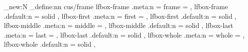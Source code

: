 
\dim_new:N \@tempdimd
\keys_define:nn { cus/frame }
  {
    lfbox-frame  .meta:n = { frame  = { \lfbox [{#1}] } } ,
    lfbox-frame .default:n = solid ,
    lfbox-first  .meta:n = { first  = { \lfbox [{#1}] } } ,
    lfbox-first .default:n = solid ,
    lfbox-middle .meta:n = { middle = { \lfbox [{#1}] } } ,
    lfbox-middle .default:n = solid ,
    lfbox-last   .meta:n = { last   = { \lfbox [{#1}] } } ,
    lfbox-last .default:n = solid ,
    lfbox-whole  .meta:n = { whole  = { \lfbox [{#1}] } } ,
    lfbox-whole .default:n = solid ,
  }